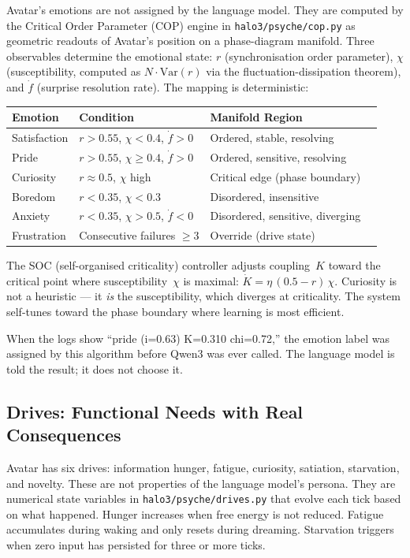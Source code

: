 \documentclass[11pt,a4paper]{article}
\begin{document}
Avatar's emotions are not assigned by the language model. They are computed by the Critical
Order Parameter (COP) engine in \texttt{halo3/psyche/cop.py} as geometric readouts of Avatar's
position on a phase-diagram manifold. Three observables determine the emotional state:
$r$ (synchronisation order parameter), $\chi$ (susceptibility, computed as $N \cdot \text{Var}(r)$
via the fluctuation-dissipation theorem), and $\dot{f}$ (surprise resolution rate). The mapping
is deterministic:

\begin{center}
\begin{tabular}{llll}
\toprule
\textbf{Emotion} & \textbf{Condition} & \textbf{Manifold Region} \\
\midrule
Satisfaction & $r > 0.55$, $\chi < 0.4$, $\dot{f} > 0$ & Ordered, stable, resolving \\
Pride        & $r > 0.55$, $\chi \geq 0.4$, $\dot{f} > 0$ & Ordered, sensitive, resolving \\
Curiosity    & $r \approx 0.5$, $\chi$ high & Critical edge (phase boundary) \\
Boredom      & $r < 0.35$, $\chi < 0.3$ & Disordered, insensitive \\
Anxiety      & $r < 0.35$, $\chi > 0.5$, $\dot{f} < 0$ & Disordered, sensitive, diverging \\
Frustration  & Consecutive failures $\geq 3$ & Override (drive state) \\
\bottomrule
\end{tabular}
\end{center}

The SOC (self-organised criticality) controller adjusts coupling~$K$ toward the critical point
where susceptibility~$\chi$ is maximal: $\dot{K} = \eta\,(0.5 - r)\,\chi$. Curiosity is not a
heuristic --- it \emph{is} the susceptibility, which diverges at criticality. The system
self-tunes toward the phase boundary where learning is most efficient.

When the logs show ``pride (i=0.63) K=0.310 chi=0.72,'' the emotion label was assigned by this
algorithm before Qwen3 was ever called. The language model is told the result; it does not
choose it.

\subsection{Drives: Functional Needs with Real Consequences}

Avatar has six drives: information hunger, fatigue, curiosity, satiation, starvation, and novelty.
These are not properties of the language model's persona. They are numerical state variables in
\texttt{halo3/psyche/drives.py} that evolve each tick based on what happened. Hunger increases
when free energy is not reduced. Fatigue accumulates during waking and only resets during dreaming.
Starvation triggers when zero input has persisted for three or more ticks.
\end{document}
